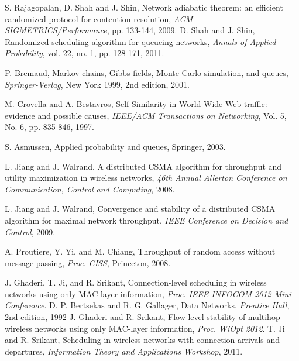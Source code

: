 \documentclass[10pt,onecolumn,draftclsnofoot,journal]{IEEEtran}
\begin{document}
\begin{thebibliography}{99}
S. Rajagopalan, D. Shah and J. Shin, Network adiabatic theorem: an efficient randomized protocol for contention resolution, \emph{ACM SIGMETRICS/Performance}, pp. 133-144, 2009.
D. Shah and J. Shin, Randomized scheduling algorithm for queueing networks, \emph{Annals of Applied Probability}, vol. 22, no. 1, pp. 128-171, 2011.


P. Bremaud, Markov chains, Gibbs fields, Monte Carlo simulation, and queues, \emph{Springer-Verlag}, New York 1999, 2nd edition, 2001.

M. Crovella and A. Bestavros, Self-Similarity in World Wide Web traffic: evidence and possible causes, \emph{IEEE/ACM Transactions on Networking}, Vol. 5, No. 6, pp. 835-846, 1997.

 S. Asmussen, Applied probability and queues, Springer, 2003.






L. Jiang and J. Walrand, A distributed CSMA algorithm for throughput and utility maximization in wireless networks, \emph{46th Annual Allerton Conference on Communication, Control and Computing}, 2008.

L. Jiang and J. Walrand, Convergence and stability of a distributed CSMA algorithm for maximal network throughput, \emph{IEEE Conference on Decision and Control}, 2009.

A. Proutiere, Y. Yi, and M. Chiang, Throughput of random access without message passing, \emph{Proc. CISS}, Princeton, 2008.

 J. Ghaderi, T. Ji, and R. Srikant, Connection-level scheduling in wireless networks using only MAC-layer information, \emph{Proc. IEEE INFOCOM 2012 Mini-Conference}.
 D. P. Bertsekas and R. G. Gallager, Data Networks, \emph{Prentice Hall}, 2nd edition, 1992
J. Ghaderi and R. Srikant, Flow-level stability of multihop wireless networks using only MAC-layer information, \emph{Proc. WiOpt 2012}.
T. Ji and R. Srikant, Scheduling in wireless networks with connection arrivals and departures, \emph{Information Theory
and Applications Workshop}, 2011.
\end{thebibliography}
\appendices
\end{document}
